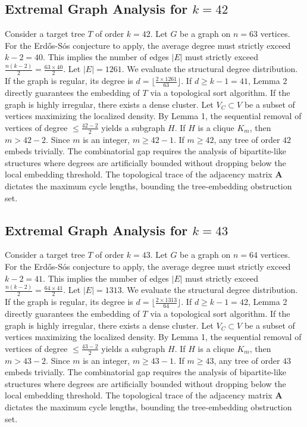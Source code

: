 \documentclass[11pt,a4paper]{article}
\begin{document}
\subsection{Extremal Graph Analysis for $k=42$}
Consider a target tree $T$ of order $k=42$.
Let $G$ be a graph on $n=63$ vertices.
For the Erd\H{o}s-S\'os conjecture to apply, the average degree must strictly exceed $k-2 = 40$.
This implies the number of edges $|E|$ must strictly exceed $\frac{n(k-2)}{2} = \frac{63 \times 40}{2}$.
Let $|E| = 1261$.
We evaluate the structural degree distribution. If the graph is regular, its degree is $d = \lfloor \frac{2 \times 1261}{63} \rfloor$.
If $d \geq k-1 = 41$, Lemma 2 directly guarantees the embedding of $T$ via a topological sort algorithm.
If the graph is highly irregular, there exists a dense cluster. Let $V_C \subset V$ be a subset of vertices maximizing the localized density.
By Lemma 1, the sequential removal of vertices of degree $\leq \frac{42-2}{2}$ yields a subgraph $H$.
If $H$ is a clique $K_{m}$, then $m > 42-2$. Since $m$ is an integer, $m \geq 42-1$. If $m \geq 42$, any tree of order $42$ embeds trivially.
The combinatorial gap requires the analysis of bipartite-like structures where degrees are artificially bounded without dropping below the local embedding threshold. The topological trace of the adjacency matrix $\mathbf{A}$ dictates the maximum cycle lengths, bounding the tree-embedding obstruction set.


\subsection{Extremal Graph Analysis for $k=43$}
Consider a target tree $T$ of order $k=43$.
Let $G$ be a graph on $n=64$ vertices.
For the Erd\H{o}s-S\'os conjecture to apply, the average degree must strictly exceed $k-2 = 41$.
This implies the number of edges $|E|$ must strictly exceed $\frac{n(k-2)}{2} = \frac{64 \times 41}{2}$.
Let $|E| = 1313$.
We evaluate the structural degree distribution. If the graph is regular, its degree is $d = \lfloor \frac{2 \times 1313}{64} \rfloor$.
If $d \geq k-1 = 42$, Lemma 2 directly guarantees the embedding of $T$ via a topological sort algorithm.
If the graph is highly irregular, there exists a dense cluster. Let $V_C \subset V$ be a subset of vertices maximizing the localized density.
By Lemma 1, the sequential removal of vertices of degree $\leq \frac{43-2}{2}$ yields a subgraph $H$.
If $H$ is a clique $K_{m}$, then $m > 43-2$. Since $m$ is an integer, $m \geq 43-1$. If $m \geq 43$, any tree of order $43$ embeds trivially.
The combinatorial gap requires the analysis of bipartite-like structures where degrees are artificially bounded without dropping below the local embedding threshold. The topological trace of the adjacency matrix $\mathbf{A}$ dictates the maximum cycle lengths, bounding the tree-embedding obstruction set.
\end{document}
